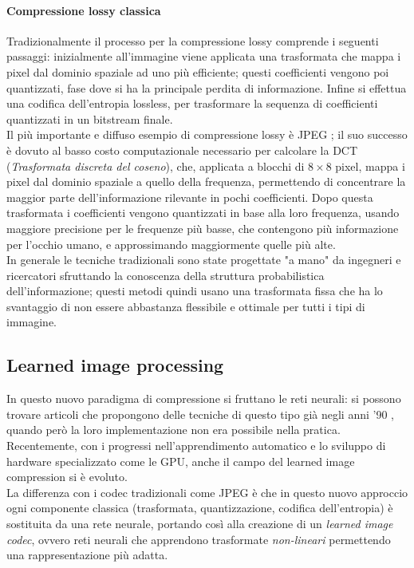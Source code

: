 \paragraph{Compressione lossy classica}
Tradizionalmente il processo per la compressione lossy comprende i seguenti passaggi: inizialmente all'immagine viene applicata una trasformata che mappa i pixel dal dominio spaziale ad uno più efficiente; questi coefficienti vengono poi quantizzati, fase dove si ha la principale perdita di informazione. Infine si effettua una codifica dell'entropia lossless, per trasformare la sequenza di coefficienti quantizzati in un bitstream finale.\\
Il più importante e diffuso esempio di compressione lossy è JPEG \cite{jpeg}; il suo successo è dovuto al basso costo computazionale necessario per calcolare la DCT (\textit{Trasformata discreta del coseno}), che, applicata a blocchi di $8 \times 8 $ pixel, mappa i pixel dal dominio spaziale a quello della frequenza, permettendo di concentrare la maggior parte dell'informazione rilevante in pochi coefficienti. Dopo questa trasformata i coefficienti vengono quantizzati in base alla loro frequenza, usando maggiore precisione per le frequenze più basse, che contengono più informazione per l'occhio umano, e approssimando maggiormente quelle più alte. \\
In generale  le tecniche tradizionali sono state progettate "a mano" da ingegneri e ricercatori sfruttando la conoscenza della struttura probabilistica dell'informazione; questi metodi quindi usano una trasformata fissa che ha lo svantaggio di non essere abbastanza flessibile e ottimale per tutti i tipi di immagine.

\subsection*{Learned image processing}
In questo nuovo paradigma di compressione si fruttano le reti neurali: si possono trovare articoli che propongono delle tecniche di questo tipo già negli anni '90 \cite{sonehara1989image, sicuranza1990artificial}, quando però la loro implementazione non era possibile nella pratica. Recentemente, con i progressi nell'apprendimento automatico e lo sviluppo di hardware specializzato come le GPU, anche il campo del learned image compression si è evoluto.\\
La differenza con i codec tradizionali come JPEG è che in questo nuovo approccio ogni componente classica (trasformata, quantizzazione, codifica dell'entropia) è sostituita da una rete neurale, portando così alla creazione di un \textit{learned image codec}, ovvero reti neurali che apprendono trasformate \textit{non-lineari} permettendo una rappresentazione più adatta.
